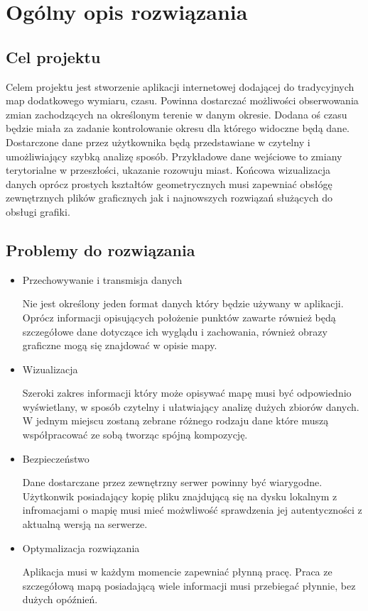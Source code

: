 \chapter{Ogólny opis rozwiązania}
\label{cha:opis}

\section{Cel projektu}
\label{sec:celProjektu}

Celem projektu jest stworzenie aplikacji internetowej dodającej do tradycyjnych map dodatkowego wymiaru, czasu. Powinna dostarczać możliwości obserwowania zmian zachodzących na określonym terenie w danym okresie. Dodana oś czasu będzie miała za zadanie kontrolowanie okresu dla którego widoczne będą dane. Dostarczone dane przez użytkownika będą przedstawiane w czytelny i umożliwiający szybką analizę sposób. Przykładowe dane wejściowe to zmiany terytorialne w przeszłości, ukazanie rozowuju miast. Końcowa wizualizacja danych oprócz prostych kształtów geometrycznych musi zapewniać obsłógę zewnętrznych plików graficznych jak i najnowszych rozwiązań służących do obsługi grafiki.

\section{Problemy do rozwiązania}
\label{sec:problemy}

\begin{itemize}

\item
Przechowywanie i transmisja danych

Nie jest określony jeden format danych który będzie używany w aplikacji. Oprócz informacji opisujących położenie punktów zawarte również będą szczegółowe dane dotyczące ich wyglądu i zachowania, również obrazy graficzne mogą się znajdować w opisie mapy.

\item
Wizualizacja

Szeroki zakres informacji który może opisywać mapę musi być odpowiednio wyświetlany, w sposób czytelny i ułatwiający analizę dużych zbiorów danych. W jednym miejscu zostaną zebrane różnego rodzaju dane które muszą współpracować ze sobą tworząc spójną kompozycję.

\item
Bezpieczeństwo

Dane dostarczane przez zewnętrzny serwer powinny być wiarygodne. Użytkonwik posiadający kopię pliku znajdującą się na dysku lokalnym z infromacjami o mapię musi mieć możwliwość sprawdzenia jej autentyczności z aktualną wersją na serwerze.

\item
Optymalizacja rozwiązania

Aplikacja musi w każdym momencie zapewniać płynną pracę. Praca  ze szczegółową mapą posiadającą wiele informacji musi przebiegać płynnie, bez dużych opóźnień.

\end{itemize}

